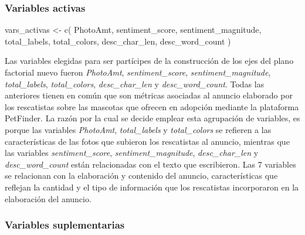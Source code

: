 \documentclass[
  spanish,
  letterpaper,
  DIV=11,
  numbers=noendperiod]{scrartcl}
\newenvironment{Shaded}{\begin{snugshade}}{\end{snugshade}}
\newcommand{\FunctionTok}[1]{\textcolor[rgb]{0.28,0.35,0.67}{#1}}
\newcommand{\NormalTok}[1]{\textcolor[rgb]{0.00,0.23,0.31}{#1}}
\newcommand{\OtherTok}[1]{\textcolor[rgb]{0.00,0.23,0.31}{#1}}
\newcommand{\StringTok}[1]{\textcolor[rgb]{0.13,0.47,0.30}{#1}}
\begin{document}
\subsubsection{Variables activas}\label{variables-activas}

\begin{Shaded}
\begin{Highlighting}[]
\NormalTok{vars\_activas }\OtherTok{\textless{}{-}} \FunctionTok{c}\NormalTok{(}
  \StringTok{\textquotesingle{}PhotoAmt\textquotesingle{}}\NormalTok{,}
  \StringTok{\textquotesingle{}sentiment\_score\textquotesingle{}}\NormalTok{,}
  \StringTok{\textquotesingle{}sentiment\_magnitude\textquotesingle{}}\NormalTok{,}
  \StringTok{\textquotesingle{}total\_labels\textquotesingle{}}\NormalTok{,}
  \StringTok{\textquotesingle{}total\_colors\textquotesingle{}}\NormalTok{,}
  \StringTok{\textquotesingle{}desc\_char\_len\textquotesingle{}}\NormalTok{,}
  \StringTok{\textquotesingle{}desc\_word\_count\textquotesingle{}}
\NormalTok{)}
\end{Highlighting}
\end{Shaded}

Las variables elegidas para ser partícipes de la construcción de los
ejes del plano factorial nuevo fueron \emph{PhotoAmt},
\emph{sentiment\_score}, \emph{sentiment\_magnitude},
\emph{total\_labels}, \emph{total\_colors}, \emph{desc\_char\_len} y
\emph{desc\_word\_count}. Todas las anteriores tienen en común que son
métricas asociadas al anuncio elaborado por los rescatistas sobre las
mascotas que ofrecen en adopción mediante la plataforma PetFinder. La
razón por la cual se decide emplear esta agrupación de variables, es
porque las variables \emph{PhotoAmt}, \emph{total\_labels} y
\emph{total\_colors} se refieren a las características de las fotos que
subieron los rescatistas al anuncio, mientras que las variables
\emph{sentiment\_score}, \emph{sentiment\_magnitude},
\emph{desc\_char\_len} y \emph{desc\_word\_count} están relacionadas con
el texto que escribieron. Las 7 variables se relacionan con la
elaboración y contenido del anuncio, características que reflejan la
cantidad y el tipo de información que los rescatistas incorporaron en la
elaboración del anuncio.

\subsubsection{Variables suplementarias}\label{variables-suplementarias}
\end{document}
